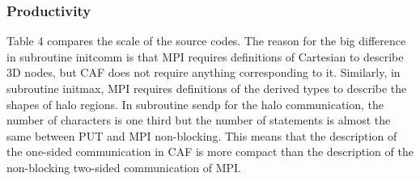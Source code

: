 \subsubsection{Productivity}

 Table 4 compares the scale of the source codes. The reason for the big difference 
in subroutine initcomm is that MPI requires definitions of Cartesian to describe 
3D nodes, but CAF does not require anything corresponding to it. Similarly, 
in subroutine initmax, MPI requires definitions of the derived types to describe 
the shapes of halo regions. In subroutine sendp for the halo communication, 
the number of characters is one third but the number of statements is almost 
the same between PUT and MPI non-blocking. This means that the description 
of the one-sided communication in CAF is more compact than the description 
of the non-blocking two-sided communication of MPI.







